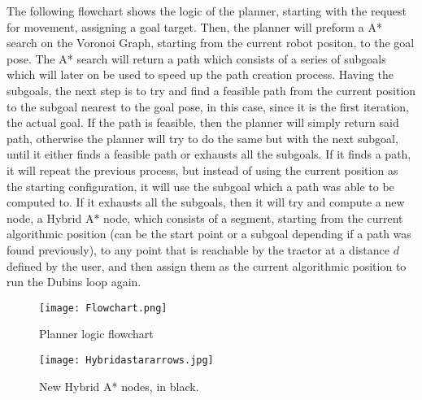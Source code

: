 The following flowchart shows the logic of the planner, starting with 
the request for movement, assigning a goal target. Then, the planner will 
preform a A* search on the Voronoi Graph, starting from the current robot 
positon, to the goal pose. The A* search will return a path which consists 
of a series of subgoals which will later on be used to speed up the 
path creation process. Having the subgoals, the next step is to try and 
find a feasible path from the current position to the subgoal nearest to 
the goal pose, in this case, since it is the first iteration, the actual goal. 
If the path is feasible, then the planner will simply return said path, otherwise
 the planner will try to do the same but with the next subgoal, until it either finds 
a feasible path or exhausts all the subgoals. If it finds a path, it will 
repeat the previous process, but instead of using the current position as the 
starting configuration, it will use the subgoal which a path was able to be 
computed to. If it exhausts all the subgoals, then it will try and compute a new node, 
a Hybrid A* node, which consists of a segment, starting from the current algorithmic position 
(can be the start point or a subgoal depending if a path was found previously), to any point 
that is reachable by the tractor at a distance $d$ defined by the user, and then assign them as the 
current algorithmic position to run the Dubins loop again.
\begin{figure}[h]
    \centering
    \texttt{[image: Flowchart.png]}
    \caption{Planner logic flowchart}
\end{figure}
\clearpage
\begin{figure}[h]
    \centering
    \texttt{[image: Hybridastararrows.jpg]}
    \caption{New Hybrid A* nodes, in black.}
\end{figure}


